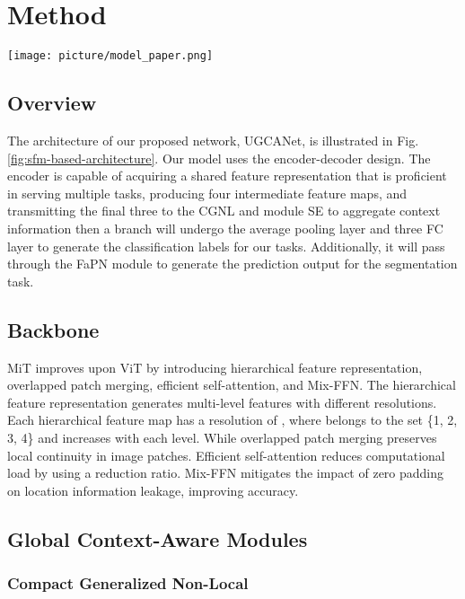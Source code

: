 \documentclass{article}
\begin{document}
\section{Method}
\label{sec:method}
\begin{figure*}[ht!]
\centerline{\texttt{[image: picture/model\_paper.png]}}
\caption{UGCANet architecture}
\label{fig:sfm-based-architecture}
\end{figure*}
\subsection{Overview}


The architecture of our proposed network, UGCANet, is illustrated in Fig. \ref{fig:sfm-based-architecture}. Our model uses the encoder-decoder design. 
The encoder is capable of acquiring a shared feature representation that is proficient in serving multiple tasks, producing four intermediate feature maps, and transmitting the final three to the CGNL \cite{cgnl} and module SE \cite{SE} to aggregate context information then a branch will undergo the average pooling layer and three FC layer to generate the classification labels for our tasks. Additionally, it will pass through the FaPN \cite{FaPN} module to generate the prediction output for the segmentation task.

\subsection{Backbone}


MiT \cite{segformer} improves upon ViT \cite{vit} by introducing hierarchical feature representation, overlapped patch merging, efficient self-attention, and Mix-FFN. The hierarchical feature representation generates multi-level features with different resolutions. Each hierarchical feature map  has a resolution of , where  belongs to the set \{1, 2, 3, 4\} and  increases with each level. While overlapped patch merging preserves local continuity in image patches. Efficient self-attention reduces computational load by using a reduction ratio. Mix-FFN mitigates the impact of zero padding on location information leakage, improving accuracy.


\subsection{Global Context-Aware Modules}


\subsubsection{Compact Generalized Non-Local}
\end{document}
